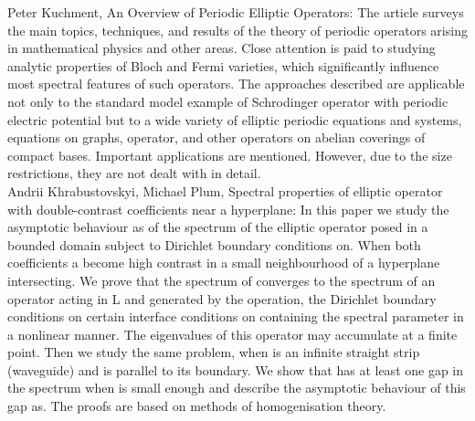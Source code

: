 Peter Kuchment, An Overview of Periodic Elliptic Operators: The article surveys the main topics, techniques, and results of the theory of periodic operators arising in mathematical physics and other areas. Close attention is paid to studying analytic properties of Bloch and Fermi varieties, which significantly influence most spectral features of such operators. The approaches described are applicable not only to the standard model example of Schrodinger operator with periodic electric potential but to a wide variety of elliptic periodic equations and systems, equations on graphs, operator, and other operators on abelian coverings of compact bases. Important applications are mentioned. However, due to the size restrictions, they are not dealt with in detail.
~\\

Andrii Khrabustovskyi, Michael Plum, Spectral properties of elliptic operator with double-contrast coefficients near a hyperplane: In this paper we study the asymptotic behaviour as of the spectrum of the elliptic operator posed in a bounded domain subject to Dirichlet boundary conditions on. When both coefficients a become high contrast in a small neighbourhood of a hyperplane intersecting. We prove that the spectrum of converges to the spectrum of an operator acting in L and generated by the operation, the Dirichlet boundary conditions on certain interface conditions on containing the spectral parameter in a nonlinear manner. The eigenvalues of this operator may accumulate at a finite point. Then we study the same problem, when is an infinite straight strip (waveguide) and is parallel to its boundary. We show that has at least one gap in the spectrum when is small enough and describe the asymptotic behaviour of this gap as. The proofs are based on methods of homogenisation theory.